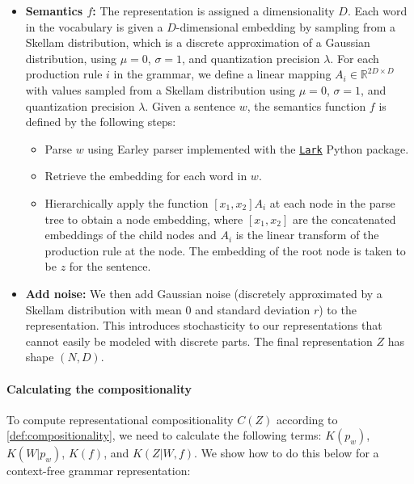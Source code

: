 \documentclass{article} %
\newcommand{\comp}{representational compositionality}
\begin{document}
\begin{appendices}
\begin{itemize}
    \item \textbf{Semantics $f$:}
    The representation is assigned a dimensionality $D$. Each word in the vocabulary is given a $D$-dimensional embedding by sampling from a Skellam distribution, which is a discrete approximation of a Gaussian distribution, using $\mu=0$, $\sigma=1$, and quantization precision $\lambda$. For each production rule $i$ in the grammar, we define a linear mapping $A_i \in \mathbb{R}^{2D \times D}$ with values sampled from a Skellam distribution using $\mu=0$, $\sigma=1$, and quantization precision $\lambda$. Given a sentence $w$, the semantics function $f$ is defined by the following steps:
    \begin{itemize}
        \item Parse $w$ using Earley parser \citep{earley1970efficient} implemented with the \href{https://github.com/lark-parser/lark}{\texttt{Lark}} Python package.

        \item Retrieve the embedding for each word in $w$.

        \item Hierarchically apply the function $[x_1, x_2]A_i$ at each node in the parse tree to obtain a node embedding, where $[x_1, x_2]$ are the concatenated embeddings of the child nodes and $A_i$ is the linear transform of the production rule at the node. The embedding of the root node is taken to be $z$ for the sentence.
    \end{itemize}
    
    \item \textbf{Add noise:}
    We then add Gaussian noise (discretely approximated by a Skellam distribution with mean 0 and standard deviation $r$) to the representation. This introduces stochasticity to our representations that cannot easily be modeled with discrete parts. The final representation $Z$ has shape $(N, D)$.
\end{itemize}

\paragraph{Calculating the compositionality}

To compute \comp{} $C(Z)$ according to \cref{def:compositionality}, we need to calculate the following terms: $K(p_w)$, $K(W|p_w)$, $K(f)$, and  $K(Z|W,f)$. We show how to do this below for a context-free grammar representation:


\end{appendices}
\end{document}
